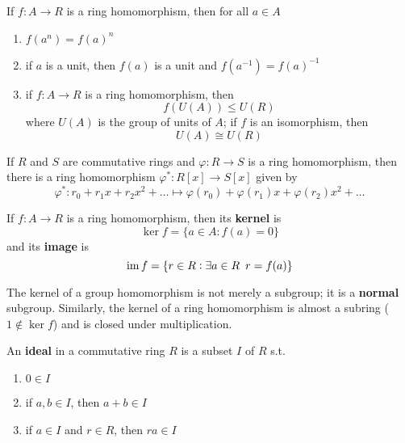 \documentclass[11pt]{article}
\begin{document}
\begin{lemma}[]
If \(f:A\to R\) is a ring homomorphism, then for all \(a\in A\)
\begin{enumerate}
\item \(f(a^n)=f(a)^n\)
\item if \(a\) is a unit, then \(f(a)\) is a unit and \(f(a^{-1})=f(a)^{-1}\)
\item if \(f:A\to R\) is a ring homomorphism, then
\begin{equation*}
f(U(A))\le U(R)
\end{equation*}
where \(U(A)\) is the group of units of \(A\); if \(f\) is an isomorphism,
then
\begin{equation*}
U(A)\cong U(R)
\end{equation*}
\end{enumerate}
\end{lemma}

\begin{proposition}[]
If \(R\) and \(S\) are commutative rings and \(\varphi:R\to S\) is a ring
homomorphism, then there is a ring homomorphism \(\varphi^*:R[x]\to S[x]\)
given by
\begin{equation*}
\varphi^*:r_0+r_1x+r_2x^2+\dots\mapsto\varphi(r_0)+\varphi(r_1)x+
\varphi(r_2)x^2+\dots
\end{equation*}
\end{proposition}

\begin{definition}[]
If \(f:A\to R\) is a ring homomorphism, then its \textbf{kernel} is
\begin{equation*}
\ker f=\{a\in A:f(a)=0\}
\end{equation*}
and its \textbf{image} is 
\begin{equation*}
\operatorname{im} f=\{r\in R:\exists a\in R\enspace r=f(a)\}
\end{equation*}
\end{definition}

The kernel of a group homomorphism is not merely a subgroup; it is a \textbf{normal}
subgroup. Similarly, the kernel of a ring homomorphism is almost a subring
(\(1\not\in\ker f\))
and is closed under multiplication.

\begin{definition}[]
An \textbf{ideal} in a commutative ring \(R\) is a subset \(I\) of \(R\) s.t. 
\begin{enumerate}
\item \(0\in I\)
\item if \(a,b\in I\), then \(a+b\in I\)
\item if \(a\in I\) and \(r\in R\), then \(ra\in I\)
\end{enumerate}
\end{definition}
\end{document}
